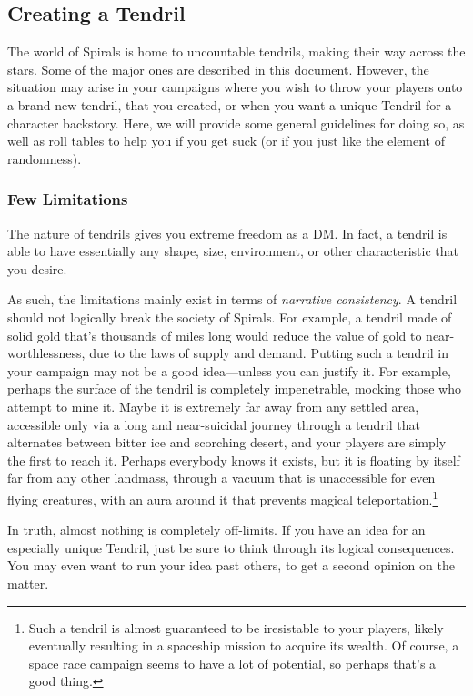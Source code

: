 \begin{multicols*}{2}
\section{Creating a Tendril}
The world of Spirals is home to uncountable tendrils, making their way across the stars.
Some of the major ones are described in this document.
However, the situation may arise in your campaigns where you wish to throw your players onto a brand-new tendril, that you created, or when you want a unique Tendril for a character backstory.
Here, we will provide some general guidelines for doing so, as well as roll tables to help you if you get suck (or if you just like the element of randomness).

\subsubsection*{Few Limitations}
The nature of tendrils gives you extreme freedom as a DM.
In fact, a tendril is able to have essentially any shape, size, environment, or other characteristic that you desire.

As such, the limitations mainly exist in terms of \textit{narrative consistency}.
A tendril should not logically break the society of Spirals.
For example, a tendril made of solid gold that's thousands of miles long would reduce the value of gold to near-worthlessness, due to the laws of supply and demand.
Putting such a tendril in your campaign may not be a good idea---unless you can justify it.
For example, perhaps the surface of the tendril is completely impenetrable, mocking those who attempt to mine it.
Maybe it is extremely far away from any settled area, accessible only via a long and near-suicidal journey through a tendril that alternates between bitter ice and scorching desert, and your players are simply the first to reach it.
Perhaps everybody knows it exists, but it is floating by itself far from any other landmass, through a vacuum that is unaccessible for even flying creatures, with an aura around it that prevents magical teleportation.\footnote{Such a tendril is almost guaranteed to be iresistable to your players, likely eventually resulting in a spaceship mission to acquire its wealth. Of course, a space race campaign seems to have a lot of potential, so perhaps that's a good thing.}

In truth, almost nothing is completely off-limits.
If you have an idea for an especially unique Tendril, just be sure to think through its logical consequences.
You may even want to run your idea past others, to get a second opinion on the matter.


\end{multicols*}
